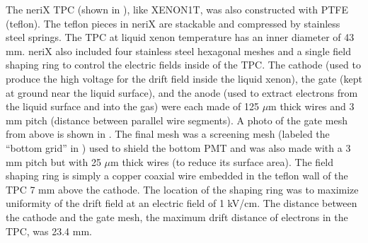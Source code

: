 The neriX TPC (shown in ), like XENON1T, was also constructed with PTFE (teflon).  The teflon pieces in neriX are stackable and compressed by stainless steel springs.  The TPC at liquid xenon temperature has an inner diameter of 43 mm.  neriX also included four stainless steel hexagonal meshes and a single field shaping ring to control the electric fields inside of the TPC.  The cathode (used to produce the high voltage for the drift field inside the liquid xenon), the gate (kept at ground near the liquid surface), and the anode (used to extract electrons from the liquid surface and into the gas) were each made of  125 $\mu$m thick wires and 3 mm pitch (distance between parallel wire segments).  A photo of the gate mesh from above is shown in .  The final mesh was a screening mesh (labeled the ``bottom grid'' in ) used to shield the bottom PMT and was also made with a 3 mm pitch but with 25 $\mu$m thick wires (to reduce its surface area).  The field shaping ring is simply a copper coaxial wire embedded in the teflon wall of the TPC 7 mm above the cathode.  The location of the shaping ring was to maximize uniformity of the drift field at an electric field of 1 kV/cm.  The distance between the cathode and the gate mesh, the maximum drift distance of electrons in the TPC, was 23.4 mm.


